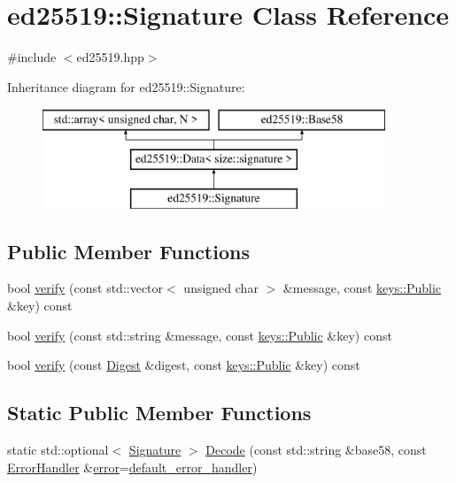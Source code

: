 \hypertarget{classed25519_1_1_signature}{}\section{ed25519\+:\+:Signature Class Reference}
\label{classed25519_1_1_signature}


{\ttfamily \#include $<$ed25519.\+hpp$>$}

Inheritance diagram for ed25519\+:\+:Signature\+:\begin{figure}[H]
\begin{center}
\leavevmode
\includegraphics[height=3.000000cm]{classed25519_1_1_signature}
\end{center}
\end{figure}
\subsection*{Public Member Functions}
\begin{DoxyCompactItemize}
\item 
bool \mbox{\hyperlink{classed25519_1_1_signature_aca2ff60a3e305730cd62e7005b92cfef}{verify}} (const std\+::vector$<$ unsigned char $>$ \&message, const \mbox{\hyperlink{classed25519_1_1keys_1_1_public}{keys\+::\+Public}} \&key) const
\item 
bool \mbox{\hyperlink{classed25519_1_1_signature_a365b186127ea5150dd233c9c89ac4faf}{verify}} (const std\+::string \&message, const \mbox{\hyperlink{classed25519_1_1keys_1_1_public}{keys\+::\+Public}} \&key) const
\item 
bool \mbox{\hyperlink{classed25519_1_1_signature_a906ffca7764e7879438a9c60d96ff207}{verify}} (const \mbox{\hyperlink{structed25519_1_1_digest}{Digest}} \&digest, const \mbox{\hyperlink{classed25519_1_1keys_1_1_public}{keys\+::\+Public}} \&key) const
\end{DoxyCompactItemize}
\subsection*{Static Public Member Functions}
\begin{DoxyCompactItemize}
\item 
static std\+::optional$<$ \mbox{\hyperlink{classed25519_1_1_signature}{Signature}} $>$ \mbox{\hyperlink{classed25519_1_1_signature_ab25f6998f84d92166a03612587420f2f}{Decode}} (const std\+::string \&base58, const \mbox{\hyperlink{namespaceed25519_a6ba572942b3c18591fc869d52a6b16e6}{Error\+Handler}} \&\mbox{\hyperlink{namespaceed25519_ac93d0b5156eaca22197055e902920bc4}{error}}=\mbox{\hyperlink{namespaceed25519_a7c7bb6ed17541162959c33ed3e3b15fb}{default\+\_\+error\+\_\+handler}})
\end{DoxyCompactItemize}

